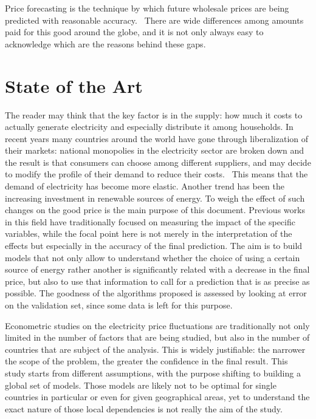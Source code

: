 \documentclass[a4paper,12pt]{book}
\begin{document}
Price forecasting is the technique by which future wholesale prices are being predicted with reasonable accuracy.~\cite{weron2014electricity} There are wide differences among amounts paid for this good around the globe, and it is not only always easy to acknowledge which are the reasons behind these gaps.

\section{State of the Art}

The reader may think that the key factor is in the supply: how much it costs to actually generate electricity and especially distribute it among households. In recent years many countries around the world have gone through liberalization of their markets: national monopolies in the electricity sector are broken down and the result is that consumers can choose among different suppliers, and may decide to modify the profile of their demand to reduce their costs.~\cite{867149} This means that the demand of electricity has become more elastic. Another trend has been the increasing investment in renewable sources of energy. To weigh the effect of such changes on the good price is the main purpose of this document. Previous works in this field have traditionally focused on measuring the impact of the specific variables, while the focal point here is not merely in the interpretation of the effects but especially in the accuracy of the final prediction. The aim is to build models that not only allow to understand whether the choice of using a certain source of energy rather another is significantly related with a decrease in the final price, but also to use that information to call for a prediction that is as precise as possible. The goodness of the algorithms proposed is assessed by looking at error on the validation set, since some data is left for this purpose.

Econometric studies on the electricity price fluctuations are traditionally not only limited in the number of factors that are being studied, but also in the number of countries that are subject of the analysis. This is widely justifiable: the narrower the scope of the problem, the greater the confidence in the final result. This study starts from different assumptions, with the purpose shifting to building a global set of models. Those models are likely not to be optimal for single countries in particular or even for given geographical areas, yet to understand the exact nature of those local dependencies is not really the aim of the study.
\end{document}
